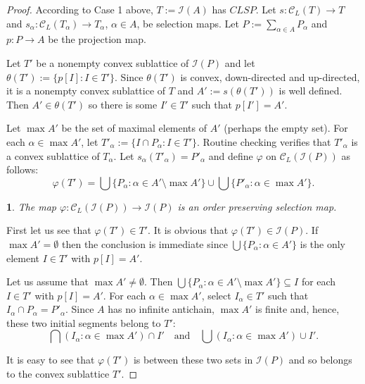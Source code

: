 \documentclass[12pt]{amsart}
\newtheorem{claim}[definition]{\noindent {\bf Claim}}
\begin{document}
\begin{proof}
According to Case 1 above, $T := \mathcal{I}(A)$ has $CLSP$.  Let
$s: \mathcal{C}_{ L}(T)\rightarrow T$ and $s_{\alpha}:\mathcal{C}_{
L}(T_{\alpha})\rightarrow T_{\alpha}$, $\alpha \in A$, be selection
maps.  Let $P:= \sum_{\alpha \in A}P_{\alpha}$ and $p: P\rightarrow A$
be the projection map.

Let $T'$ be a nonempty convex sublattice of $\mathcal {I}(P)$ and let
$\theta (T'):= \{p[I]: I\in T'\}$.  Since $\theta (T')$ is convex,
down-directed and up-directed, it is a nonempty convex sublattice of
$T$ and $A':=s(\theta (T'))$ is well defined.  Then $A' \in
\theta(T')$ so there is some $I' \in T'$ such that $p[I'] = A'$.

Let $\max A'$ be the set of maximal elements of $A'$ (perhaps the
empty set).  For each $\alpha \in \max A'$, let $T'_{\alpha}:= \{I\cap
P_{\alpha} : I \in T' \}$.  Routine checking verifies that
$T'_{\alpha}$ is a convex sublattice of $T_{\alpha}$.  Let
$s_{\alpha}(T'_{\alpha}) = P'_{\alpha}$ and define $\varphi$ on
$\mathcal{C}_{ L}(\mathcal{I}(P))$ as follows: $$\varphi (T')= \bigcup
\{P_{\alpha}: \alpha \in A' \setminus \max A' \} \cup
\bigcup\{P'_{\alpha}: \alpha \in \max A' \} .$$

\begin{claim} 
The map $\varphi :\mathcal{C}_{ L} (\mathcal{I}(P))\rightarrow
\mathcal{I}(P)$ is an order preserving selection map.
\end{claim} 

First let us see that $\varphi(T')\in T'$.  It is obvious that
$\varphi(T') \in \mathcal{I}(P)$.  If $\max A' = \emptyset$ then the
conclusion is immediate since $\bigcup \{P_{\alpha}: \alpha \in A'\}$
is the only element $I \in T'$ with $p[I] = A'$.

Let us assume that $\max A' \ne \emptyset$.  Then $\bigcup
\{P_{\alpha}: \alpha \in A' \setminus \max A' \}\subseteq I$ for each
$I\in T'$ with $p[I] = A'$.  For each $\alpha \in \max A'$, select
$I_{\alpha} \in T'$ such that $I_{\alpha}\cap P_{\alpha}=P'_{\alpha}$.
Since $A$ has no infinite antichain, $\max A'$ is finite and, hence,
these two initial segments belong to $T'$: $$ \bigcap ( I_{\alpha} :
\alpha \in \max A' ) \cap I'  \quad \text{and} \quad \bigcup ( I_{\alpha}:
\alpha \in \max A' ) \cup I' .$$ 

It is easy to see that $\varphi(T')$
is between these two sets in $\mathcal{I}(P)$ and so belongs to the
convex sublattice $T'$.


\end{proof}
\end{document}
